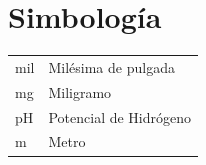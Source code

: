 \chapter{Simbolog\'ia}
\renewcommand{\arraystretch}{1.5}
\begin{table}[htbp]
\begin{tabular}{ll}
mil   & Mil\'esima de pulgada   \\
mg    & Miligramo \\
pH    & Potencial de Hidr\'ogeno        \\
m     & Metro      
\end{tabular}
\end{table}